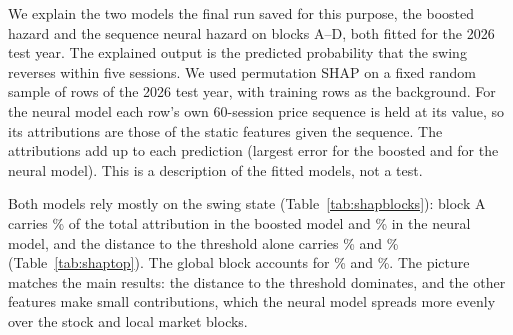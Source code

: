 We explain the two models the final run saved for this purpose, the boosted hazard and the sequence
neural hazard on blocks A--D, both fitted for the 2026 test year. The explained output is the
predicted probability that the swing reverses within five sessions. We used permutation SHAP on a
fixed random sample of \ShapRows{} rows of the 2026 test year, with \ShapBackground{} training rows
as the background. For the neural model each row's own 60-session price sequence is held at its
value, so its attributions are those of the static features given the sequence. The attributions
add up to each prediction (largest error \ShapGbmAdditivity{} for the boosted and
\ShapNnAdditivity{} for the neural model). This is a description of the fitted models, not a test.

Both models rely mostly on the swing state (Table~\ref{tab:shapblocks}): block A carries
\ShapGbmBlockA\% of the total attribution in the boosted model and \ShapNnBlockA\% in the neural
model, and the distance to the threshold alone carries \ShapGbmTopShare\% and \ShapNnTopShare\%
(Table~\ref{tab:shaptop}). The global block accounts for \ShapGbmBlockD\% and \ShapNnBlockD\%. The
picture matches the main results: the distance to the threshold dominates, and the other features
make small contributions, which the neural model spreads more evenly over the stock and local
market blocks.

\begin{table}[H]
\centering
\caption{Share of the total mean absolute SHAP value by feature block, 2026 test year, two models
fitted for 2026, \ShapRows{} rows.}\label{tab:shapblocks}
\footnotesize
{}
\end{table}

\begin{table}[H]
\centering
\caption{The twelve features with the largest mean absolute SHAP value, in percentage points of
the five-session reversal probability ($\times 100$), with the feature's block in parentheses.
Dir.: sign of the correlation between the feature and its SHAP value (higher feature value, higher
or lower predicted probability).}\label{tab:shaptop}
\footnotesize
{}
\end{table}
